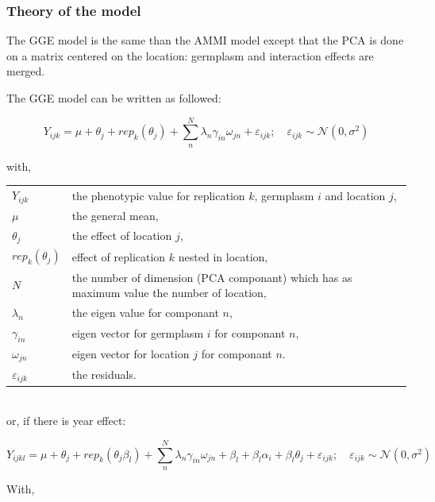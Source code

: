 \documentclass{book}\usepackage[]{graphicx}\usepackage[]{color}
\begin{document}
\subsubsection{Theory of the model}

The GGE model is the same than the AMMI model except that the PCA is done on a matrix centered on the location: germplasm and interaction effects are merged.

The GGE model can be written as followed:

\begin{equation}
Y_{ijk} = \mu + \theta_{j} + rep_{k}(\theta_{j}) + \sum_{n}^{N} \lambda_{n} \gamma_{in} \omega_{jn} + \varepsilon_{ijk}; \quad \varepsilon_{ijk} \sim \mathcal{N} (0,\sigma^2)
\label{modele_gge}
\end{equation}

with,

\begin{tabular}{ll}
$Y_{ijk}$ & the phenotypic value for replication $k$, germplasm $i$ and location $j$,\\
$\mu$ & the general mean,\\
$\theta_{j}$ & the effect of location $j$,\\
$rep_{k}(\theta_{j})$ & effect of replication $k$ nested in location,\\
$N$ & the number of dimension (PCA componant) which has as maximum value the number of location,\\
$\lambda_{n}$ & the eigen value for componant $n$,\\
$\gamma_{in}$ & eigen vector for germplasm $i$ for componant $n$,\\
$\omega_{jn}$ & eigen vector for  location $j$  for componant $n$.\\
$\varepsilon_{ijk}$ & the residuals.\\
\end{tabular}

~\\

or, if there is year effect:


\begin{equation}
Y_{ijkl} = \mu + \theta_{j} + rep_{k}(\theta_{j}\beta_{l}) +\sum_{n}^{N} \lambda_{n} \gamma_{in} \omega_{jn} + 
\beta_{l} + \beta_{l}\alpha_{i} + \beta_{l}\theta_{j} + 
\varepsilon_{ijk}; \quad \varepsilon_{ijk} \sim \mathcal{N} (0,\sigma^2)
\label{ammi_anova}
\end{equation}

With,
\end{document}
